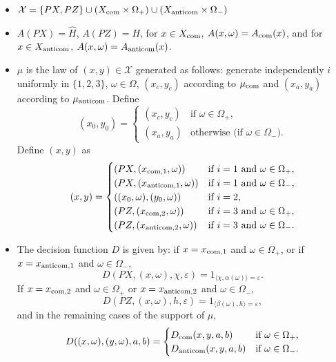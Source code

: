 \documentclass[JEP,XML,SOM,Unicode,published]{cedram}
\newcommand{\com}{\textup{com}}
\theoremstyle{plain}
\theoremstyle{definition}
\newcommand{\cX}{\mathcal{X}}
\newcommand{\anticom}{\textup{anticom}}
\begin{document}
\begin{itemize}
\item $\cX = \{PX,PZ\}\cup (X_{\com} \times \Omega_+) \cup (X_{\anticom} \times \Omega_-)$
\item $A(PX) = \hat H$, $A(PZ) = H$, for $x \in X_{\com}$, $A(x,\omega) = A_{\com}(x)$, and for $x \in X_{\anticom}$, $A(x,\omega)=A_{\anticom}(x)$.
\item $\mu$ is the law of $(x,y) \in \cX$ generated as follows: generate independently $i$ uniformly in $\{1,2,3\}$, $\omega \in \Omega$, $(x_c,y_c)$ according to $\mu_{\com}$ and $(x_a,y_a)$ according to $\mu_{\anticom}$. Define\vspace*{-3pt}
\[
(x_0,y_0) =\begin{cases} (x_c,y_c) &\text{if }\omega \in \Omega_+,\\
(x_a,y_a)&\text{otherwise (if }\omega \in \Omega_-).
\end{cases}
\]
Define $(x,y)$ as\vspace*{-3pt}
\begin{equation}\label{eq:def_mu}
(x,y) =\begin{cases}
(PX,(x_{\com,1},\omega)) &\text{if $i=1$ and $\omega \in \Omega_+$},\\
(PX,(x_{\anticom,1},\omega)) &\text{if $i=1$ and $\omega \in \Omega_-$},\\
((x_0,\omega),(y_0,\omega))&\text{if $i=2$},\\
(PZ,(x_{\com,2},\omega)) &\text{if $i=3$ and $\omega \in \Omega_+$},\\
(PZ,(x_{\anticom,2},\omega)) &\text{if $i=3$ and $\omega \in \Omega_-$}.\\
\end{cases}
\end{equation}
\item The decision function $D$ is given by: if $x=x_{\com,1}$ and $\omega \in \Omega_+$, or if $x=x_{\anticom,1}$ and $\omega \in \Omega_-$,
\[
D(PX,(x,\omega),\chi,\varepsilon) = 1_{\langle \chi,\alpha(\omega)\rangle = \varepsilon}.
\]If $x=x_{\com,2}$ and $\omega \in \Omega_+$ or $x=x_{\anticom,2}$ and $\omega \in \Omega_-$,
\[
D(PZ,(x,\omega),h,\varepsilon) = 1_{\langle \beta(\omega),h\rangle = \varepsilon},
\]
and in the remaining cases of the support of $\mu$,
\[
D((x,\omega),(y,\omega),a,b) = \begin{cases} D_{\com}(x,y,a,b)&\text{if }\omega \in \Omega_+,\\
D_{\anticom}(x,y,a,b)&\text{if }\omega \in \Omega_-.
\end{cases}
\]
\end{itemize}
\end{document}
